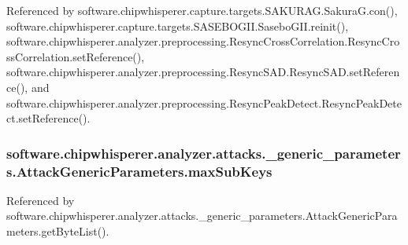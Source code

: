 Referenced by software.\+chipwhisperer.\+capture.\+targets.\+S\+A\+K\+U\+R\+A\+G.\+Sakura\+G.\+con(), software.\+chipwhisperer.\+capture.\+targets.\+S\+A\+S\+E\+B\+O\+G\+I\+I.\+Sasebo\+G\+I\+I.\+reinit(), software.\+chipwhisperer.\+analyzer.\+preprocessing.\+Resync\+Cross\+Correlation.\+Resync\+Cross\+Correlation.\+set\+Reference(), software.\+chipwhisperer.\+analyzer.\+preprocessing.\+Resync\+S\+A\+D.\+Resync\+S\+A\+D.\+set\+Reference(), and software.\+chipwhisperer.\+analyzer.\+preprocessing.\+Resync\+Peak\+Detect.\+Resync\+Peak\+Detect.\+set\+Reference().

\hypertarget{classsoftware_1_1chipwhisperer_1_1analyzer_1_1attacks_1_1__generic__parameters_1_1AttackGenericParameters_a951954758524793b2a594e37a26df876}{}
\subsubsection[{max\+Sub\+Keys}]{\setlength{\rightskip}{0pt plus 5cm}software.\+chipwhisperer.\+analyzer.\+attacks.\+\_\+generic\+\_\+parameters.\+Attack\+Generic\+Parameters.\+max\+Sub\+Keys}\label{classsoftware_1_1chipwhisperer_1_1analyzer_1_1attacks_1_1__generic__parameters_1_1AttackGenericParameters_a951954758524793b2a594e37a26df876}


Referenced by software.\+chipwhisperer.\+analyzer.\+attacks.\+\_\+generic\+\_\+parameters.\+Attack\+Generic\+Parameters.\+get\+Byte\+List().

\hypertarget{classsoftware_1_1chipwhisperer_1_1analyzer_1_1attacks_1_1__generic__parameters_1_1AttackGenericParameters_aed19c974ec412f46ba6f21a2d7c60852}{}
